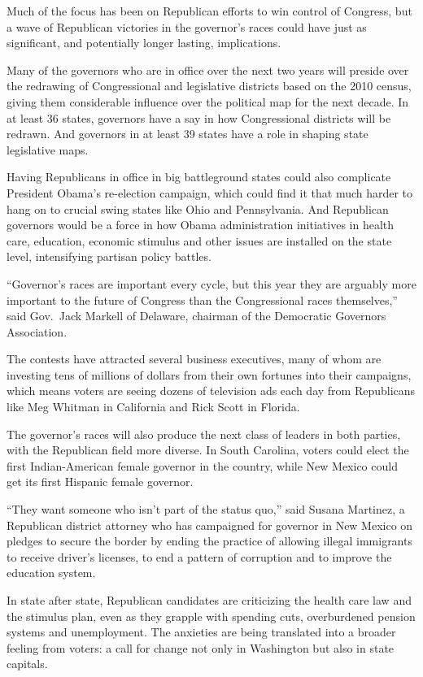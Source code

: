 ﻿\documentclass[12pt]{article}
\begin{document}
Much of the focus has been on Republican efforts to win control of Congress, but a wave of
Republican victories in the governor's races could have just as significant, and potentially longer
lasting, implications.

Many of the governors who are in office over the next two years will preside over the redrawing of
Congressional and legislative districts based on the 2010 census, giving them considerable influence
over the political map for the next decade. In at least 36 states, governors have a say in how
Congressional districts will be redrawn. And governors in at least 39 states have a role in shaping
state legislative maps.

Having Republicans in office in big battleground states could also complicate President Obama's
re-election campaign, which could find it that much harder to hang on to crucial swing states like
Ohio and Pennsylvania. And Republican governors would be a force in how Obama administration
initiatives in health care, education, economic stimulus and other issues are installed on the state
level, intensifying partisan policy battles.

``Governor's races are important every cycle, but this year they are arguably more important to the
future of Congress than the Congressional races themselves,'' said Gov.~Jack Markell of Delaware,
chairman of the Democratic Governors Association.

The contests have attracted several business executives, many of whom are investing tens of millions
of dollars from their own fortunes into their campaigns, which means voters are seeing dozens of
television ads each day from Republicans like Meg Whitman in California and Rick Scott in Florida.

The governor's races will also produce the next class of leaders in both parties, with the
Republican field more diverse. In South Carolina, voters could elect the first Indian-American
female governor in the country, while New Mexico could get its first Hispanic female governor.

``They want someone who isn't part of the status quo,'' said Susana Martinez, a Republican district
attorney who has campaigned for governor in New Mexico on pledges to secure the border by ending the
practice of allowing illegal immigrants to receive driver's licenses, to end a pattern of corruption
and to improve the education system.

In state after state, Republican candidates are criticizing the health care law and the stimulus
plan, even as they grapple with spending cuts, overburdened pension systems and unemployment. The
anxieties are being translated into a broader feeling from voters: a call for change not only in
Washington but also in state capitals.
\end{document}
